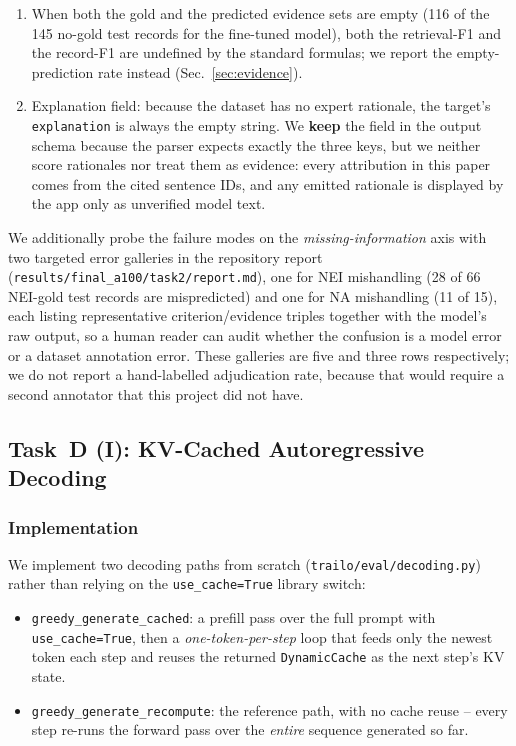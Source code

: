 \documentclass[conference]{IEEEtran}
\newcommand{\code}[1]{\texttt{\small #1}}
\begin{document}
\begin{enumerate}[leftmargin=*, itemsep=1pt, topsep=2pt]
\item When both the gold and the predicted evidence sets are
empty (116 of the 145 no-gold test records for the fine-tuned
model), both the retrieval-F1 and the record-F1 are undefined by
the standard formulas; we report the empty-prediction rate
instead (Sec.~\ref{sec:evidence}).
\item Explanation field: because the dataset has
no expert rationale, the target's \code{explanation} is always
the empty string. We \textbf{keep} the field in the output schema
because the parser expects exactly the three keys, but we neither
score rationales nor treat them as evidence: every attribution in
this paper comes from the cited sentence IDs, and any emitted
rationale is displayed by the app only as unverified model text.
\end{enumerate}

We additionally probe the failure modes on the
\emph{missing-information} axis with two targeted error galleries
in the repository report
(\code{results/final\_a100/task2/report.md}), one for
NEI mishandling (28 of 66 NEI-gold test records are mispredicted)
and one for NA mishandling (11 of 15), each listing representative
criterion/evidence triples together with the model's raw output,
so a human reader can audit whether the confusion is a
model error or a dataset annotation error. These galleries are
five and three rows respectively; we do not report a hand-labelled
adjudication rate, because that would require a second annotator
that this project did not have.

\subsection{Task~D (I): KV-Cached Autoregressive Decoding}
\label{sec:decoding}

\subsubsection{Implementation}
We implement two decoding paths from scratch
(\code{trailo/eval/decoding.py}) rather than relying on the
\code{use\_cache=True} library switch:

\begin{itemize}[leftmargin=*, itemsep=1pt, topsep=2pt]
\item \code{greedy\_generate\_cached}: a prefill pass over the
full prompt with \code{use\_cache=True}, then a
\emph{one-token-per-step} loop that feeds only the newest token
each step and reuses the returned
\code{DynamicCache} as the next step's KV state.
\item \code{greedy\_generate\_recompute}: the reference path, with
no cache reuse -- every step re-runs the forward pass over the
\emph{entire} sequence generated so far.
\end{itemize}
\end{document}
